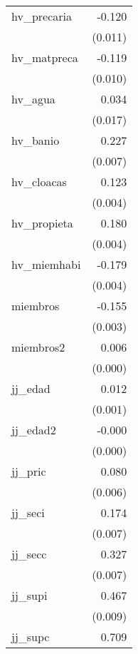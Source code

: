 {\begin{longtable}{l*{1}{D{.}{.}{-1}}}
hv\_precaria &      -0.120\sym{***}\\
            &     (0.011)         \\
\addlinespace
hv\_matpreca &      -0.119\sym{***}\\
            &     (0.010)         \\
\addlinespace
hv\_agua     &       0.034\sym{*}  \\
            &     (0.017)         \\
\addlinespace
hv\_banio    &       0.227\sym{***}\\
            &     (0.007)         \\
\addlinespace
hv\_cloacas  &       0.123\sym{***}\\
            &     (0.004)         \\
\addlinespace
hv\_propieta &       0.180\sym{***}\\
            &     (0.004)         \\
\addlinespace
hv\_miemhabi &      -0.179\sym{***}\\
            &     (0.004)         \\
\addlinespace
miembros    &      -0.155\sym{***}\\
            &     (0.003)         \\
\addlinespace
miembros2   &       0.006\sym{***}\\
            &     (0.000)         \\
\addlinespace
jj\_edad     &       0.012\sym{***}\\
            &     (0.001)         \\
\addlinespace
jj\_edad2    &      -0.000\sym{***}\\
            &     (0.000)         \\
\addlinespace
jj\_pric     &       0.080\sym{***}\\
            &     (0.006)         \\
\addlinespace
jj\_seci     &       0.174\sym{***}\\
            &     (0.007)         \\
\addlinespace
jj\_secc     &       0.327\sym{***}\\
            &     (0.007)         \\
\addlinespace
jj\_supi     &       0.467\sym{***}\\
            &     (0.009)         \\
\addlinespace
jj\_supc     &       0.709\sym{***}\\

\end{longtable}}
